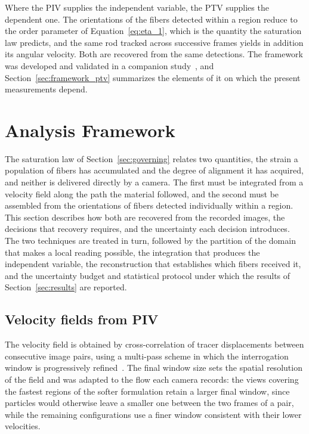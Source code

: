 \documentclass[%
  aip,
  pof,          %
  reprint,      %
  floatfix
]{revtex4-2}
\begin{document}
Where the PIV supplies the independent variable, the PTV supplies the dependent one. The orientations of the fibers detected within a region reduce to the order parameter of Equation~\eqref{eq:eta_1}, which is the quantity the saturation law predicts, and the same rod tracked across successive frames yields in addition its angular velocity. Both are recovered from the same detections. The framework was developed and validated in a companion study~\cite{wolff2025ptv}, and Section~\ref{sec:framework_ptv} summarizes the elements of it on which the present measurements depend.

\section{Analysis Framework}
\label{sec:framework}

The saturation law of Section~\ref{sec:governing} relates two quantities, the strain a population of fibers has accumulated and the degree of alignment it has acquired, and neither is delivered directly by a camera. The first must be integrated from a velocity field along the path the material followed, and the second must be assembled from the orientations of fibers detected individually within a region. This section describes how both are recovered from the recorded images, the decisions that recovery requires, and the uncertainty each decision introduces. The two techniques are treated in turn, followed by the partition of the domain that makes a local reading possible, the integration that produces the independent variable, the reconstruction that establishes which fibers received it, and the uncertainty budget and statistical protocol under which the results of Section~\ref{sec:results} are reported.

\subsection{Velocity fields from PIV}
\label{sec:framework_piv}

The velocity field is obtained by cross-correlation of tracer displacements between consecutive image pairs, using a multi-pass scheme in which the interrogation window is progressively refined~\cite{scarano2002iterative,raffel2018particle}. The final window size sets the spatial resolution of the field and was adapted to the flow each camera records: the views covering the fastest regions of the softer formulation retain a larger final window, since particles would otherwise leave a smaller one between the two frames of a pair, while the remaining configurations use a finer window consistent with their lower velocities.
\end{document}
